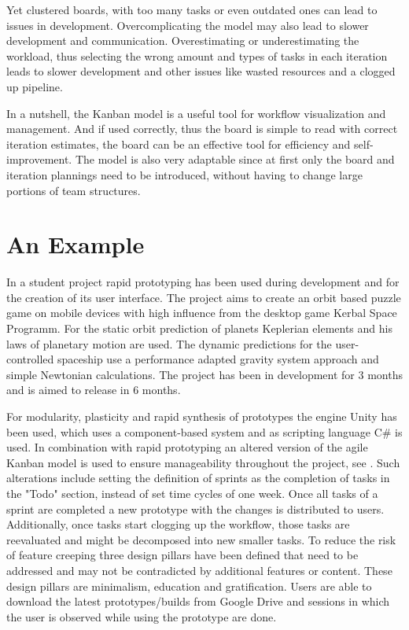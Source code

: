 \documentclass[runningheads]{llncs}
\begin{document}
Yet clustered boards, with too many tasks or even outdated ones can lead to issues in development. Overcomplicating the model may 
also lead to slower development and communication. Overestimating or underestimating the workload, thus selecting the wrong amount and
types of tasks in each iteration leads to slower development and other issues like wasted resources and a clogged up pipeline.

In a nutshell, the Kanban model is a useful tool for workflow visualization and management. And if used correctly, thus the board is simple to read 
with correct iteration estimates, the board can be an effective tool for efficiency and self-improvement. The model is also very adaptable 
since at first only the board and iteration plannings need to be introduced, without having to change large portions of team structures.


\section{An Example}
In a student project\cite{ref_planeter} rapid prototyping has been used during development and for the creation of its user interface. 
The project aims to create an orbit based puzzle game on mobile devices with high influence from the desktop game 
Kerbal Space Programm. For the static orbit prediction of planets Keplerian elements and his laws of planetary motion
are used. The dynamic predictions for the user-controlled spaceship use a performance adapted gravity system approach
and simple Newtonian calculations. The project has been in development for 3 months and is aimed to release in 6 months.

For modularity, plasticity and rapid synthesis of prototypes the engine Unity has been used, which uses a component-based system 
and as scripting language C\# is used. In combination with rapid prototyping an altered version of the agile Kanban\cite{ref_kanban} model 
is used to ensure manageability throughout the project, see . Such alterations include setting the definition of sprints 
as the completion of tasks in the "Todo" section, instead of set time cycles of one week. 
Once all tasks of a sprint are completed a new prototype with the changes is distributed to users.
Additionally, once tasks start clogging up the workflow, those tasks are reevaluated and might be decomposed into new smaller tasks.
To reduce the risk of feature creeping three design pillars have been defined that need to be addressed and may not be contradicted by additional features or content. These design pillars are minimalism, education and gratification. Users are able to 
download the latest prototypes/builds from Google Drive\cite{ref_planeterProto} and sessions in which the user is observed while using the prototype are done.
\end{document}
